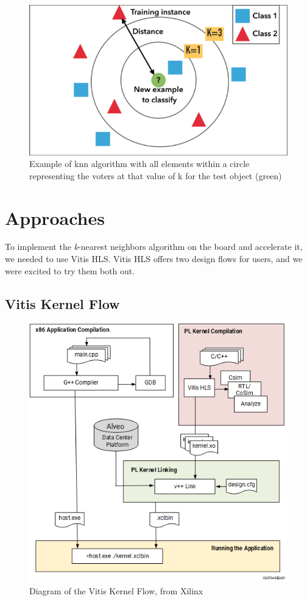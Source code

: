 \documentclass[11pt, final, conference, letterpaper, twocolumn]{IEEEtran}[2015/08/26]
\begin{document}
\begin{figure}
  \centering
  \includegraphics[width=.75\linewidth]{knearestneighbors.png}
  \caption{Example of knn algorithm with all elements within a circle representing the voters at that value of k for the test object (green)}
  \label{fig:ex:knn}
\end{figure}


\section{Approaches}
\label{sec:approaches}

To implement the \textit{k}-nearest neighbors algorithm on the board and accelerate it, we needed to use Vitis HLS. Vitis HLS offers two design flows for users, and we were excited to try them both out.

\subsection{Vitis Kernel Flow}

\begin{figure}
  \centering
  \includegraphics[width=.75\linewidth]{vitiskernelflow.png}
  \caption{Diagram of the Vitis Kernel Flow, from Xilinx}
  \label{fig:ex:vitiskernelflow}
\end{figure}
\end{document}
